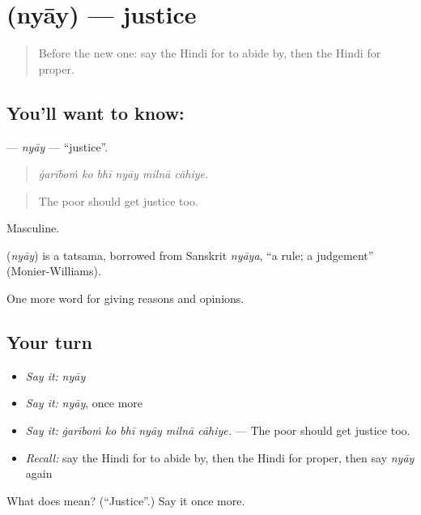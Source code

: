 \section[\texorpdfstring{\hi{न्याय} (nyāy)}{न्याय (nyāy)}]{ (nyāy) — justice}

\label{lesson:HI-C351-nyay}



\begin{quote}
Before the new one: say the Hindi for to abide by, then the Hindi for proper.
\end{quote}

\subsection*{You'll want to know: }
\textbf{} — \emph{nyāy} — \textquotedblleft{}justice\textquotedblright{}.

\begin{quote}
     
\end{quote}

\begin{quote}
\emph{ġarīboṁ ko bhī nyāy milnā cāhiye.}
\end{quote}

\begin{quote}
The poor should get justice too.
\end{quote}

Masculine.

\begin{cousinweb}
\textbf{} (\emph{nyāy}) is a tatsama, borrowed from Sanskrit \emph{nyāya}, \textquotedblleft{}a rule; a judgement\textquotedblright{} (Monier-Williams).
\end{cousinweb}

\begin{grammarlens}[title={What you've built}]
One more word for giving reasons and opinions.
\end{grammarlens}

\subsection*{Your turn}
\begin{itemize}
\raggedright
  \item \emph{Say it:} \emph{nyāy}
  \item \emph{Say it:} \emph{nyāy}, once more
  \item \emph{Say it:} \emph{ġarīboṁ ko bhī nyāy milnā cāhiye.} — The poor should get justice too.
  \item \emph{Recall:} say the Hindi for to abide by, then the Hindi for proper, then say \emph{nyāy} again
\end{itemize}

\begin{tcolorbox}[breakable,colback=teal!4,colframe=teal!35!black,title={Before you move on}]
What does  mean? (\textquotedblleft{}Justice\textquotedblright{}.) Say it once more.
\end{tcolorbox}

